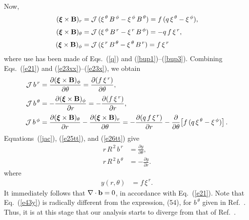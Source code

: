 \documentclass[12pt,prb,aps]{revtex4-1}
\newcommand {\bxi}{\mbox{\boldmath$\xi$}}
\begin{document}
Now,\cite{tj}
\begin{align}
(\bxi\times {\bf B})_r&= {\cal J}\,(\xi^{\,\theta}\,B^{\,\phi} - \xi^{\,\phi}\,B^{\,\theta}) = f\,(q\,\xi^{\,\theta}-\xi^{\,\phi}),\label{e23xx}\\[0.5ex]
(\bxi\times {\bf B})_\theta&= {\cal J}\,(\xi^{\,\phi}\,B^{\,r} - \xi^{\,r}\,B^{\,\phi}) = -q\,f\,\xi^{\,r},\\[0.5ex]
(\bxi\times {\bf B})_\phi &= {\cal J}\,(\xi^{\,r}\,B^{\,\theta} - \xi^{\,\theta}\,B^{\,r})= f\,\xi^{\,r}\label{e23x}
\end{align}
where use has been made of  Eqs.~(\ref{q}) and (\ref{bup1})--(\ref{bup3}).
 Combining Eqs.~(\ref{e21}) and (\ref{e23xx})--(\ref{e23x}), we obtain\,\cite{tj}
\begin{align}
{\cal J}\,b^{\,r} &= \frac{\partial (\bxi\times {\bf B})_\phi }{\partial\theta}= \frac{\partial (f\,\xi^{\,r})}{\partial\theta},\label{e25tt}\\[0.5ex]
{\cal J}\,b^{\,\theta} &=-\frac{\partial (\bxi\times {\bf B})_\phi }{\partial r}= -\frac{\partial (f\,\xi^{\,r})}{\partial r},\label{e26tt}\\[0.5ex]
{\cal J}\,b^{\,\phi}&=\frac{\partial (\bxi\times {\bf B})_\theta}{\partial r}-\frac{\partial (\bxi\times {\bf B})_r }{\partial \theta}=
 -\frac{\partial (q\,f\,\xi^{\,r})}{\partial r} - \frac{\partial}{\partial\theta}\!\left[f\,(q\,\xi^{\,\theta}-\xi^{\,\phi})\right].\label{e27tt}
\end{align}
Equations~(\ref{jac}), (\ref{e25tt}), and (\ref{e26tt}) give\,\cite{tj}
\begin{align}\label{e41}
r\,R^{\,2}\,b^{\,r}& = \frac{\partial y}{\partial\theta},\\[0.5ex]
r\,R^{\,2}\,b^{\,\theta} &= - \frac{\partial y}{\partial r}.\label{e43y}
\end{align}
where 
\begin{align}\label{e42}
y(r,\theta) &=f\,\xi^{\,r}.
\end{align}
It immediately follows that $\nabla\cdot{\bf b} =0$, in accordance with  Eq.~(\ref{e21}). 
Note that Eq.~(\ref{e43y}) is radically different from the expression, (54), for $b^{\,\theta}$ given in Ref.~. Thus, it is at this stage that our analysis
starts to diverge from that of Ref.~.
\end{document}

